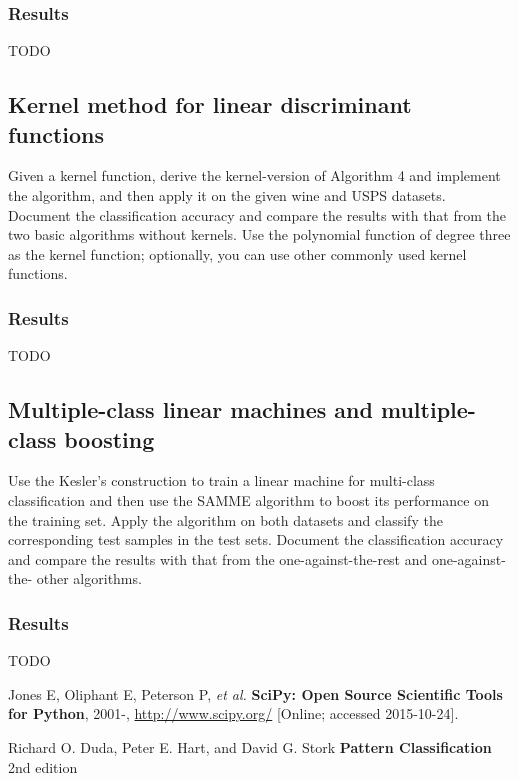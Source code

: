 \documentclass{article}
\begin{document}
\subsubsection*{Results}
{\large TODO}


\subsection{Kernel method for linear discriminant functions}
Given a kernel function, derive the kernel-version of Algorithm 4 and implement the algorithm, and then apply it on the given wine and USPS datasets. Document the classification accuracy and compare the results with that from the two basic algorithms without kernels. Use the polynomial function of degree three as the kernel function; optionally, you can use other commonly used kernel functions.

\subsubsection*{Results}
{\large TODO}



\subsection{Multiple-class linear machines and multiple-class boosting}
Use the Kesler’s construction to train a linear machine for multi-class classification and then use the SAMME algorithm to boost its performance on the training set. Apply the algorithm on both datasets and classify the corresponding test samples in the test sets. Document the classification accuracy and compare the results with that from the one-against-the-rest and one-against-the- other algorithms.

\subsubsection{Results}
{\large TODO}


\begin{thebibliography}{9}

    Jones E, Oliphant E, Peterson P, \emph{et al.}
    {\bf SciPy: Open Source Scientific Tools for Python}, 2001-,
    \url{http://www.scipy.org/} [Online; accessed 2015-10-24].
    
	Richard O. Duda, Peter E. Hart, and David G. Stork
	{\bf Pattern Classification} 2nd edition

\end{thebibliography}
\end{document}
